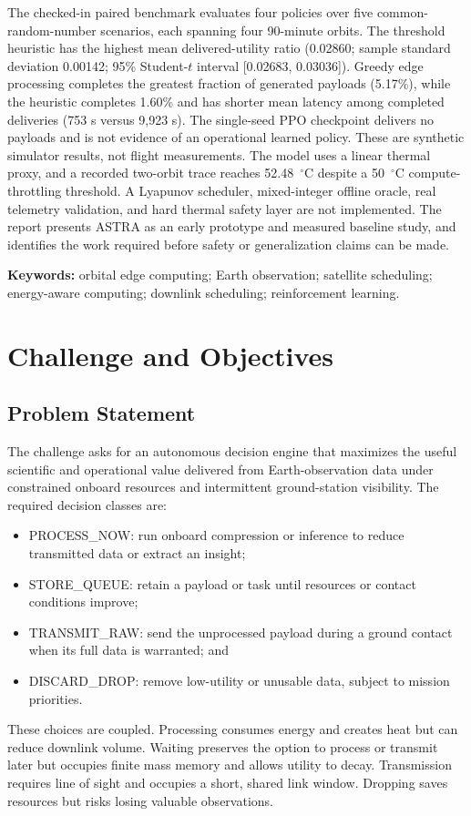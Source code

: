 \documentclass[11pt,letterpaper]{article}
\begin{document}
The checked-in paired benchmark evaluates four policies over five common-random-number scenarios, each spanning four 90-minute orbits. The threshold heuristic has the highest mean delivered-utility ratio (0.02860; sample standard deviation 0.00142; 95\% Student-$t$ interval [0.02683, 0.03036]). Greedy edge processing completes the greatest fraction of generated payloads (5.17\%), while the heuristic completes 1.60\% and has shorter mean latency among completed deliveries (753 s versus 9,923 s). The single-seed PPO checkpoint delivers no payloads and is not evidence of an operational learned policy. These are synthetic simulator results, not flight measurements. The model uses a linear thermal proxy, and a recorded two-orbit trace reaches 52.48~$^\circ$C despite a 50~$^\circ$C compute-throttling threshold. A Lyapunov scheduler, mixed-integer offline oracle, real telemetry validation, and hard thermal safety layer are not implemented. The report presents ASTRA as an early prototype and measured baseline study, and identifies the work required before safety or generalization claims can be made.

\vspace{0.5em}
\textbf{Keywords:} orbital edge computing; Earth observation; satellite scheduling; energy-aware computing; downlink scheduling; reinforcement learning.

\clearpage
\tableofcontents
\clearpage

\section{Challenge and Objectives}
\subsection{Problem Statement}
The challenge asks for an autonomous decision engine that maximizes the useful scientific and operational value delivered from Earth-observation data under constrained onboard resources and intermittent ground-station visibility. The required decision classes are:
\begin{itemize}
    \item \textrm{PROCESS\_NOW}: run onboard compression or inference to reduce transmitted data or extract an insight;
    \item \textrm{STORE\_QUEUE}: retain a payload or task until resources or contact conditions improve;
    \item \textrm{TRANSMIT\_RAW}: send the unprocessed payload during a ground contact when its full data is warranted; and
    \item \textrm{DISCARD\_DROP}: remove low-utility or unusable data, subject to mission priorities.
\end{itemize}
These choices are coupled. Processing consumes energy and creates heat but can reduce downlink volume. Waiting preserves the option to process or transmit later but occupies finite mass memory and allows utility to decay. Transmission requires line of sight and occupies a short, shared link window. Dropping saves resources but risks losing valuable observations.
\end{document}
